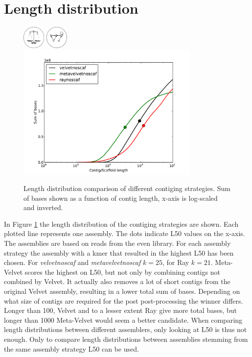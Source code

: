 \documentclass[a4paper,12pt]{report}
\begin{document}
\section{Length distribution}
\label{res:len}
\begin{figure}[ht!]
  \centering
    \includegraphics[width=0.1\textwidth]{figures/logos/even.png}
    \includegraphics[width=0.1\textwidth]{figures/logos/contig.png}\\
  \centering
    \includegraphics[width=0.8\textwidth,trim=35 20 35 33, clip]{figures/notebooks/chris-mock-length-distribution/even-contig.pdf}
  \caption{Length distribution comparison of different contiging strategies.
      Sum of bases shown as a function of contig length, x-axis is log-scaled
      and inverted. }
  \label{fig:length-distribution-even-contig-length}
\end{figure}

In Figure \ref{fig:length-distribution-even-contig-length} the length
distribution of the contiging strategies are shown. Each plotted line
represents one assembly. The dots indicate L50 values on the x-axis. The assemblies are based on
reads from the even library. For each assembly strategy the assembly with a
kmer that resulted in the highest L50 has been chosen. For {\em velvetnoscaf}
and {\em metavelvetnoscaf} $k=25$, for Ray $k=21$. Meta-Velvet scores the
highest on L50, but not only by combining contigs not combined by Velvet.  It
actually also removes a lot of short contigs from the original Velvet assembly,
resulting in a lower total sum of bases. Depending on what size of contigs are
required for the post post-processing the winner differs. Longer than 100,
Velvet and to a lesser extent Ray give more total bases, but longer than 1000
Meta-Velvet would seem a better candidate. When comparing length distributions
between different assemblers, only looking at L50 is thus not enough. Only to
compare length distributions between assemblies stemming from the same assembly
strategy L50 can be used.\\
\end{document}
